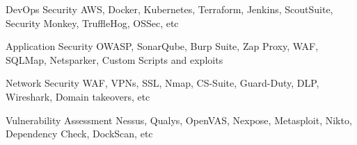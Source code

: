 

\begin{cvskills}

  \cvskill
    {DevOps Security} %
    {AWS, Docker, Kubernetes, Terraform, Jenkins, ScoutSuite, Security Monkey, TruffleHog, OSSec, etc} %

  \cvskill
    {Application Security} %
    {OWASP, SonarQube, Burp Suite, Zap Proxy, WAF, SQLMap, Netsparker, Custom Scripts and exploits } %

  \cvskill
    {Network Security} %
    {WAF, VPNs, SSL, Nmap, CS-Suite, Guard-Duty, DLP, Wireshark, Domain takeovers, etc } %

  \cvskill
    {Vulnerability Assessment } %
    {Nessus, Qualys, OpenVAS, Nexpose, Metasploit, Nikto, Dependency Check, DockScan, etc } %

\end{cvskills}
